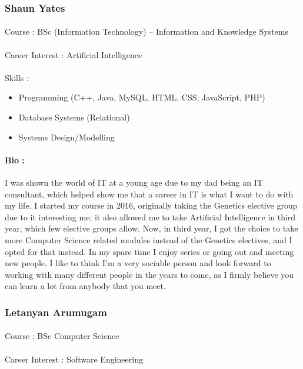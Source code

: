 \documentclass[11pt]{article}
\begin{document}
\subsubsection{Shaun Yates}
\paragraph{}Course : BSc (Information Technology) – Information and Knowledge Systems
\paragraph{}Career Interest : Artificial Intelligence
\paragraph{}Skills :  
\begin{itemize}
\item Programming (C++, Java, MySQL, HTML, CSS, JavaScript, PHP)
\item Database Systems (Relational)
\item Systems Design/Modelling
\end{itemize}
\paragraph{Bio :} I was shown the world of IT at a young age due to my dad being an IT consultant, which helped show me that a career in IT is what I want 
to do with my life. I started my course in 2016, originally taking the Genetics elective group due to it interesting me; it also allowed 
me to take Artificial Intelligence in third year, which few elective groups allow. Now, in third year, I got the choice to take more 
Computer Science related modules instead of the Genetics electives, and I opted for that instead. In my spare time I enjoy series or 
going out and meeting new people. I like to think I’m a very sociable person and look forward to working with many different people in 
the years to come, as I firmly believe you can learn a lot from anybody that you meet.

\subsubsection{Letanyan Arumugam}
\paragraph{}Course : BSc Computer Science 
\paragraph{}Career Interest : Software Engineering
\end{document}
